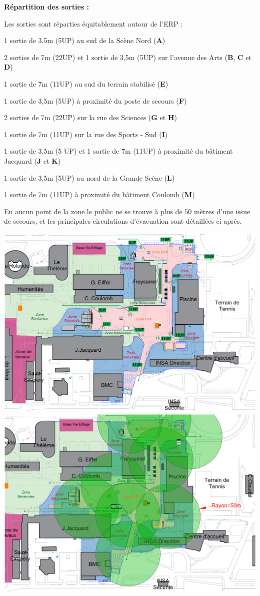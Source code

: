 \documentclass[hidelinks, paper=a4, fontsize=13pt]{report}
\begin{document}
\textbf{Répartition des sorties :}

Les sorties sont réparties équitablement autour de l’ERP :
\begin{list}{•}{}
	\item1 sortie de 3,5m (5UP) au sud de la Scène Nord (\textbf{A}) 
	\item2 sorties de 7m (22UP) et 1 sortie de 3,5m (5UP) sur l’avenue des Arts (\textbf{B}, \textbf{C} et \textbf{D})
	\item1 sortie de 7m (11UP) au sud du terrain stabilisé (\textbf{E})
	\item1 sortie de 3,5m (5UP) à proximité du poste de secours (\textbf{F})
	\item2 sorties de 7m (22UP) sur la rue des Sciences (\textbf{G} et \textbf{H})
	\item1 sortie de 7m (11UP) sur la rue des Sports - Sud (\textbf{I})
	\item1 sortie de 3,5m (5 UP) et 1 sortie de 7m (11UP) à proximité du bâtiment Jacquard (\textbf{J} et \textbf{K})
	\item1 sortie de 3,5m (5UP) au nord de la Grande Scène (\textbf{L})
	\item1 sortie de 7m (11UP) à proximité du bâtiment Coulomb (\textbf{M})
\end{list}

En aucun point de la zone le public ne se trouve à plus de 50 mètres d’une issue de secours, et les principales circulations d’évacuation sont détaillées ci-après. 

\begin{center}
	\includegraphics[width=1\textwidth,keepaspectratio, angle=90]{Exports/Plan_24h_45eme-IS}
	\includegraphics[width=.8\textwidth,keepaspectratio, angle=90]{Exports/Plan_24h_45eme-Cercles}
\end{center}
\end{document}
